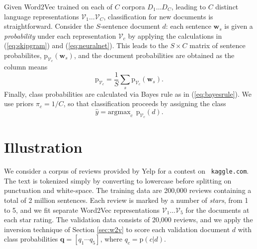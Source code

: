 \documentclass[11pt]{article}
\begin{document}


 
Given Word2Vec trained on each of $C$ corpora $D_1 \ldots D_C$, leading to $C$
distinct language representations $\mathcal{V}_1 \dots \mathcal{V}_C$, classification for new documents is straightforward.  Consider the $S$-sentence document $d$:  each sentence $\mathbf{w}_s$ is given a {\it probability} under each representation $\mathcal{V}_c$ by applying the calculations in (\ref{eq:skipgram}) and (\ref{eq:neuralnet}).  This leads to the $S \times C$ matrix of sentence probabilites, $\mathrm{p}_{\mathcal{V}_c}(\mathbf{w}_s)$, and the document probabilities are obtained as the column means
\begin{equation}
\mathrm{p}_{\mathcal{V}_c} = \frac{1}{S}\sum_s \mathrm{p}_{\mathcal{V}_c}(\mathbf{w}_s).
\end{equation}
Finally, class probabilities are calculated via Bayes rule as in (\ref{eq:bayesrule}).  We use priors $\pi_c = 1/C$, so that classification proceeds by assigning the class
\begin{equation}\label{eq:class}
\hat y = \mathrm{argmax}_c ~~\mathrm{p}_{\mathcal{V}_c}(d).
\end{equation}



\section{Illustration}

We consider a corpus of reviews provided by Yelp for a contest on {\tt
kaggle.com}.  The text is tokenized simply by converting to lowercase before splitting on punctuation and white-space.  The training data are 200,000 reviews containing a total of 2
million sentences. Each review is marked by a number of {\it stars}, from 1
to 5, and we fit separate Word2Vec representations $\mathcal{V}_1 \ldots
\mathcal{V}_5$ for the documents at each star rating.  The validation data
consists of 20,000 reviews, and we apply the inversion technique of Section
\ref{sec:w2v} to score each validation document $d$ with class probabilities
$\mathbf{q} = [q_1 \cdots q_5]$, where $q_c = \mathrm{p}(c|d)$.
\end{document}
